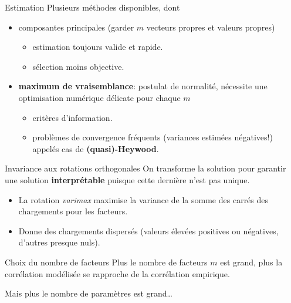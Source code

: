 \documentclass[
  ignorenonframetext,
]{beamer}
\providecommand{\tightlist}{%
  \setlength{\itemsep}{0pt}\setlength{\parskip}{0pt}}\usepackage{longtable,booktabs,array}
\begin{document}
\begin{frame}{Estimation}
\protect\hypertarget{estimation}{}
Plusieurs méthodes disponibles, dont

\begin{itemize}
\tightlist
\item
  composantes principales (garder \(m\) vecteurs propres et valeurs
  propres)

  \begin{itemize}
  \tightlist
  \item
    estimation toujours valide et rapide.
  \item
    sélection moins objective.
  \end{itemize}
\item
  \textbf{maximum de vraisemblance}: postulat de normalité, nécessite
  une optimisation numérique délicate pour chaque \(m\)

  \begin{itemize}
  \tightlist
  \item
    critères d'information.
  \item
    problèmes de convergence fréquents (variances estimées négatives!)
    appelés cas de \textbf{(quasi)-Heywood}.
  \end{itemize}
\end{itemize}
\end{frame}

\begin{frame}{Invariance aux rotations orthogonales}
\protect\hypertarget{invariance-aux-rotations-orthogonales}{}
On transforme la solution pour garantir une solution
\textbf{interprétable} puisque cette dernière n'est pas unique.

\begin{itemize}
\tightlist
\item
  La rotation \emph{varimax} maximise la variance de la somme des carrés
  des chargements pour les facteurs.
\item
  Donne des chargements dispersés (valeurs élevées positives ou
  négatives, d'autres presque nuls).
\end{itemize}
\end{frame}

\begin{frame}{Choix du nombre de facteurs}
\protect\hypertarget{choix-du-nombre-de-facteurs}{}
Plus le nombre de facteurs \(m\) est grand, plus la corrélation
modélisée se rapproche de la corrélation empirique.

Mais plus le nombre de paramètres est grand\ldots{}
\end{frame}
\end{document}
